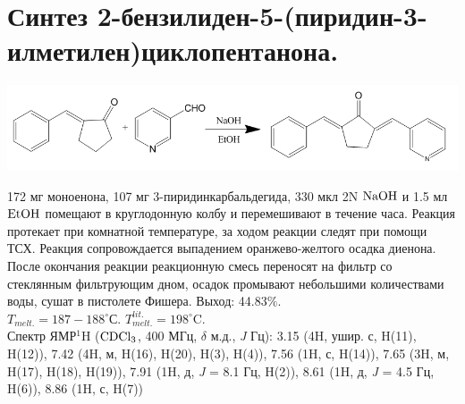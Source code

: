 \documentclass[a4paper]{article}
\begin{document}
\section{Синтез 2-бензилиден-5-(пиридин-3-илметилен)циклопентанона.}
\begin{center}
\includegraphics[scale=0.35]{pictures/3.png}
\end{center}
172 мг моноенона, 107 мг 3-пиридинкарбальдегида, 330 мкл 2N $\ce{NaOH}$ и 1.5 мл $\ce{EtOH}$ помещают в круглодонную колбу и перемешивают в течение часа. Реакция протекает при комнатной температуре, за ходом реакции следят при помощи ТСХ. Реакция сопровождается выпадением оранжево-желтого осадка диенона. После окончания реакции реакционную смесь переносят на фильтр со стеклянным фильтрующим дном, осадок промывают небольшими количествами воды, сушат в пистолете Фишера.
Выход: 44.83$\%$. \\
$T_{melt.} = 187-188^{\circ}$С. $T_{melt.}^{lit.} = 198^{\circ}$C. \cite{vatsadze2005} \\
Спектр ЯМР$^{1}$H ($\ce{CDCl3}$, 400 МГц, $\delta$ м.д., \textit{J} Гц): 3.15 (4H, ушир. с, H(11), H(12)), 7.42 (4H, м, H(16), H(20), H(3), H(4)), 7.56 (1H, с, H(14)), 7.65 (3H, м, H(17), H(18), H(19)), 7.91 (1H, д, \textit{J} = 8.1 Гц, H(2)), 8.61 (1H, д, \textit{J} = 4.5 Гц, H(6)), 8.86 (1H, с, H(7))
\end{document}
